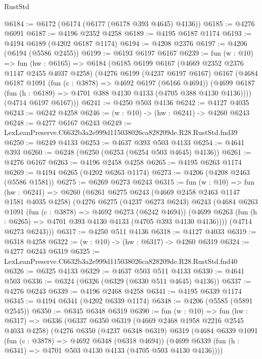 \begin{lexlean}{RustStd}
\begin{coremodule}
@6184 := @6172 (@6174 (@6177 (@6178 @393 @4645) @4136))
@6185 := @4276 @6091
@6187 := @4196 @2352 @4258
@6189 := @4195 @6187 @1174
@6193 := @4194 @6189 (@4202 @6187 @1174)
@6194 := @4208 @2376
@6197 := @4206 (@6194 (@5586 @2455))
@6199 := @6193 @6197 @6167
@6239 := fun (w : @10) =>
  fun (hw : @6165) =>
  @6184
    (@6185
      @6199
      @6167
      (@4669 @2352 @2376 @1147 @2455 @4037 @4258)
      (@4276
        @6199
        (@4237 @6197 @6167)
        @6167
        (@4684
          @6187
          @1091
          (fun (c : @3878) => @4692 @6197 (@6166 @4694))
          (@4699 @6187 (fun (h : @6189) => @4701 @388 @4130 @4133 (@4705 @388 @4130 @4136))))
        (@4714 @6197 @6167)))
@6241 := @4250 @503 @4136
@6242 := @4127 @4035
@6243 := @6242 @4258
@6246 := (w : @10) -> (hw : @6241) -> @4260 @6243
@6248 := @4277 @6167 @6243
@6249 := LexLeanPreserve.C6632b3a2e999d115038026ca828209de.R28.RustStd.fnd39
@6250 := @6249 @4133
@6253 := @4637 @393 @503 @4133
@6254 := @4641 @393
@6260 := @6248 (@6250 (@6253 (@6254 @503 @4645) @4136))
@6261 := @4276 @6167
@6263 := @4196 @2458 @4258
@6265 := @4195 @6263 @1174
@6269 := @4194 @6265 (@4202 @6263 @1174)
@6273 := @4206 (@4208 @2463 (@5586 @1581))
@6275 := @6269 @6273 @6243
@6315 := fun (w : @10) =>
  fun (hw : @6241) =>
  @6260
    (@6261
      @6275
      @6243
      (@4669 @2458 @2463 @1147 @1581 @4035 @4258)
      (@4276
        @6275
        (@4237 @6273 @6243)
        @6243
        (@4684
          @6263
          @1091
          (fun (c : @3878) => @4692 @6273 (@6242 @4694))
          (@4699 @6263 (fun (h : @6265) => @4701 @393 @4130 @4133 (@4705 @393 @4130 @4136))))
        (@4714 @6273 @6243)))
@6317 := @4250 @511 @4136
@6318 := @4127 @4033
@6319 := @6318 @4258
@6322 := (w : @10) -> (hw : @6317) -> @4260 @6319
@6324 := @4277 @6243 @6319
@6325 := LexLeanPreserve.C6632b3a2e999d115038026ca828209de.R28.RustStd.fnd40
@6326 := @6325 @4133
@6329 := @4637 @503 @511 @4133
@6330 := @4641 @503
@6336 := @6324 (@6326 (@6329 (@6330 @511 @4645) @4136))
@6337 := @4276 @6243
@6339 := @4196 @2468 @4258
@6341 := @4195 @6339 @1174
@6345 := @4194 @6341 (@4202 @6339 @1174)
@6348 := @4206 (@5585 (@5891 @2545))
@6350 := @6345 @6348 @6319
@6390 := fun (w : @10) =>
  fun (hw : @6317) =>
  @6336
    (@6337
      @6350
      @6319
      (@4669 @2468 @1958 @2216 @2545 @4033 @4258)
      (@4276
        @6350
        (@4237 @6348 @6319)
        @6319
        (@4684
          @6339
          @1091
          (fun (c : @3878) => @4692 @6348 (@6318 @4694))
          (@4699 @6339 (fun (h : @6341) => @4701 @503 @4130 @4133 (@4705 @503 @4130 @4136))))

\end{coremodule}
\end{lexlean}
